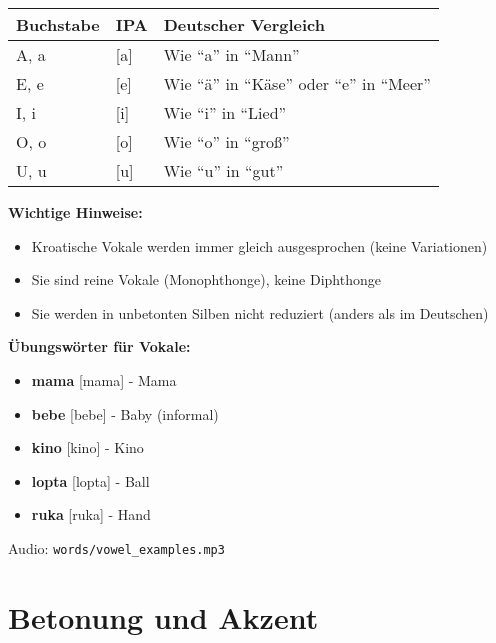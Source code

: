 \begin{tcolorbox}[colback=lightgreen!30, colframe=green!60!black, title=\textbf{Kroatische Vokale}]

\begin{center}
\begin{tabular}{lll}
\toprule
\textbf{Buchstabe} & \textbf{IPA} & \textbf{Deutscher Vergleich} \\
\midrule
A, a & [a] & Wie ``a'' in ``Mann'' \\
E, e & [e] & Wie ``ä'' in ``Käse'' oder ``e'' in ``Meer'' \\
I, i & [i] & Wie ``i'' in ``Lied'' \\
O, o & [o] & Wie ``o'' in ``groß'' \\
U, u & [u] & Wie ``u'' in ``gut'' \\
\bottomrule
\end{tabular}
\end{center}

\textbf{Wichtige Hinweise:}
\begin{itemize}
    \item Kroatische Vokale werden immer gleich ausgesprochen (keine Variationen)
    \item Sie sind reine Vokale (Monophthonge), keine Diphthonge
    \item Sie werden in unbetonten Silben nicht reduziert (anders als im Deutschen)
\end{itemize}

\textbf{Übungswörter für Vokale:}
\begin{itemize}
    \item \textbf{mama} [mama] - Mama
    \item \textbf{bebe} [bebe] - Baby (informal)
    \item \textbf{kino} [kino] - Kino
    \item \textbf{lopta} [lopta] - Ball
    \item \textbf{ruka} [ruka] - Hand
\end{itemize}

Audio: \texttt{words/vowel\_examples.mp3}

\end{tcolorbox}

\section{Betonung und Akzent}

